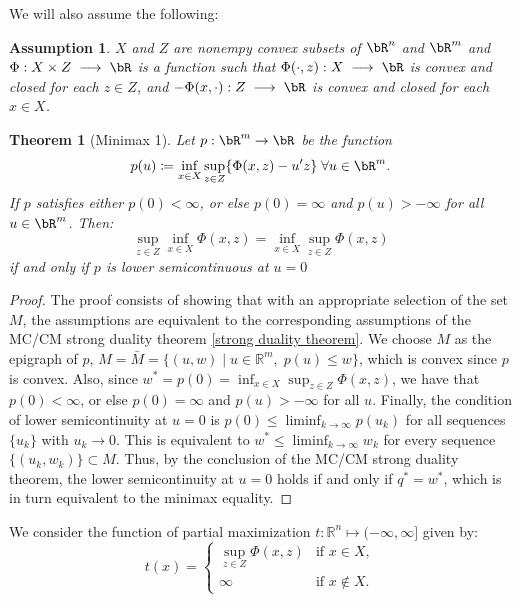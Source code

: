 \documentclass[11pt,a4paper,oneside,openany]{book}
\newtheorem{assumption}{Assumption}
\newtheorem{theorem}{Theorem}
\numberwithin{definition}{section}
\numberwithin{theorem}{section}
\numberwithin{problem}{section}
\newcommand{\la}{\; \longrightarrow \;}
\begin{document}

We will also assume the following:
\begin{assumption}
    $X$ and $Z$ are nonempy convex subsets of $\bR^n$ and $\bR^m$ and $\Phi : X \times Z \la \bR$ is a function such that \(\Phi(\cdot,z): X \la \bR\) is convex and closed for each $z \in Z$, and $- \Phi(x,\cdot): Z \la \bR$ is convex and closed for each $x \in X$.
\end{assumption}

\begin{theorem}[Minimax 1]
    Let \(p:\bR^m \to \bR\) be the function    
    \[
    p(u) \coloneqq \inf_{x \in X} \sup_{z \in Z} \{\Phi(x,z) - u'z\}\; \forall u \in \bR^m .
    \]
    If $p$ satisfies either $p(0) < \infty$, or else \(p(0) = \infty\) and \(p(u) > -\infty\) for all $u \in \bR^m$. Then:
    \begin{equation*}
        \sup_{z \in Z} \inf_{x \in X} \Phi(x,z) = \inf_{x \in X} \sup_{z \in Z} \Phi(x,z)
    \end{equation*}
    if and only if $p$ is lower semicontinuous at $u = 0$
\end{theorem}
\begin{proof}
The proof consists of showing that with an appropriate selection of the set \( M \), the assumptions are equivalent to the corresponding assumptions of the MC/CM strong duality theorem \ref{strong duality theorem}. We choose \( M \) as the epigraph of \( p \), \( M = \bar{M} = \{(u,w) \mid u \in \mathbb{R}^m,\; p(u) \leq w\} \), which is convex since \( p \) is convex. Also, since \( w^* = p(0) = \inf_{x \in X}\sup_{z \in Z}\Phi(x,z) \), we have that \( p(0) < \infty \), or else \( p(0) = \infty \) and \( p(u) > -\infty \) for all \( u \). Finally, the condition of lower semicontinuity at \( u = 0 \) is \( p(0) \leq \liminf_{k \to \infty} p(u_k) \) for all sequences \(\{u_k\}\) with \( u_k \to 0 \). This is equivalent to \( w^* \leq \liminf_{k \to \infty} w_k \) for every sequence \(\{(u_k,w_k)\} \subset M\). Thus, by the conclusion of the MC/CM strong duality theorem, the lower semicontinuity at \( u = 0 \) holds if and only if \( q^* = w^* \), which is in turn equivalent to the minimax equality.

\end{proof}

We consider the function of partial maximization \( t : \mathbb{R}^n \mapsto (-\infty, \infty] \) given by:
\begin{equation*}
    t(x) = \begin{cases}
        \sup_{z \in Z} \Phi(x, z) & \text{if } x \in X ,\\
        \infty & \text{if } x \notin X .
    \end{cases}
\end{equation*}
\end{document}
